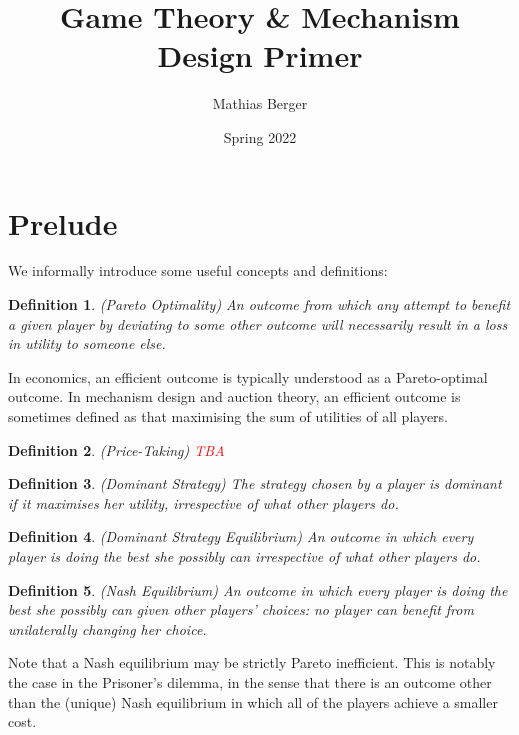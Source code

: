 \documentclass{article}
\title{Game Theory \& Mechanism Design Primer}
\author{Mathias Berger}
\date{Spring 2022}
\newtheorem{definition}{Definition}
\begin{document}
\maketitle

\section{Prelude}

We informally introduce some useful concepts and definitions:

\begin{definition}
(Pareto Optimality) An outcome from which any attempt to benefit a given player by deviating to some other outcome will necessarily result in a loss in utility to someone else.
\end{definition}

In economics, an efficient outcome is typically understood as a Pareto-optimal outcome. In mechanism design and auction theory, an efficient outcome is sometimes defined as that maximising the sum of utilities of all players.

\begin{definition}
(Price-Taking) \textcolor{red}{TBA}
\end{definition}  

\begin{definition}
(Dominant Strategy) The strategy chosen by a player is dominant if it maximises her utility, irrespective of what other players do.
\end{definition}

\begin{definition}
(Dominant Strategy Equilibrium) An outcome in which every player is doing the best she possibly can irrespective of what other players do.
\end{definition}

\begin{definition}
(Nash Equilibrium) An outcome in which every player is doing the best she possibly can given other players' choices: no player can benefit from unilaterally changing her choice.
\end{definition}

Note that a Nash equilibrium may be strictly Pareto inefficient. This is notably the case in the Prisoner's dilemma, in the sense that there is an outcome other than the (unique) Nash equilibrium in which all of the players achieve a smaller cost.

\end{document}
